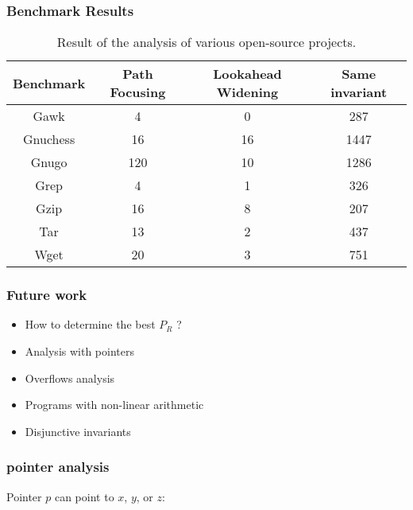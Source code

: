 \documentclass{beamer}
\begin{document}
\begin{frame}
\frametitle{Benchmark Results}

\begin{table}
\centering \small
\begin{tabular}{|c||c|c|c|} \hline 
Benchmark & Path Focusing & Lookahead Widening & Same invariant \\
\hline \hline
Gawk		& 4 & 0 & 287 \\ \hline
Gnuchess	& 16 & 16 & 1447 \\ \hline
Gnugo		& 120 & 10 & 1286 \\ \hline
Grep		& 4 & 1 & 326 \\ \hline
Gzip		& 16 & 8 & 207 \\ \hline
Tar			& 13 & 2 & 437 \\ \hline
Wget		& 20 & 3 & 751 \\ \hline
\end{tabular}
\caption{Result of the analysis of various open-source projects.}
\label{opensource}
\end{table}
\end{frame}

\begin{frame}
  \frametitle{Future work}
\begin{itemize}
\item How to determine the best $P_R$ ?
\item Analysis with pointers
\item Overflows analysis
\item Programs with non-linear arithmetic
\item Disjunctive invariants
\end{itemize}
\end{frame}

\begin{frame}
\frametitle{pointer analysis}
Pointer $p$ can point to $x$, $y$, or $z$: 
\begin{center}
\end{center}
\end{frame}
\end{document}
